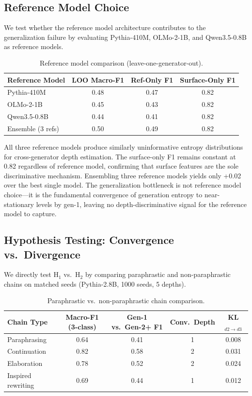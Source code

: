 \documentclass[letterpaper]{article}
\begin{document}
\subsection{Reference Model Choice}
\label{sec:refmodel}

We test whether the reference model architecture contributes to the generalization failure by evaluating Pythia-410M, OLMo-2-1B, and Qwen3.5-0.8B as reference models.

\begin{table}[h]
\centering
\caption{Reference model comparison (leave-one-generator-out).}
\label{tab:refmodel}
\begin{tabular}{lccc}
\toprule
Reference Model & LOO Macro-F1 & Ref-Only F1 & Surface-Only F1 \\
\midrule
Pythia-410M & 0.48 & 0.47 & 0.82 \\
OLMo-2-1B & 0.45 & 0.43 & 0.82 \\
Qwen3.5-0.8B & 0.44 & 0.41 & 0.82 \\
Ensemble (3 refs) & 0.50 & 0.49 & 0.82 \\
\bottomrule
\end{tabular}
\end{table}

All three reference models produce similarly uninformative entropy distributions for cross-generator depth estimation. The surface-only F1 remains constant at 0.82 regardless of reference model, confirming that surface features are the sole discriminative mechanism. Ensembling three reference models yields only +0.02 over the best single model. The generalization bottleneck is not reference model choice---it is the fundamental convergence of generation entropy to near-stationary levels by gen-1, leaving no depth-discriminative signal for the reference model to capture.

\subsection{Hypothesis Testing: Convergence vs.\ Divergence}
\label{sec:convergence}

We directly test H$_1$ vs.\ H$_2$ by comparing paraphrastic and non-paraphrastic chains on matched seeds (Pythia-2.8B, 1000 seeds, 5 depths).

\begin{table}[h]
\centering
\caption{Paraphrastic vs.\ non-paraphrastic chain comparison.}
\label{tab:convergence}
\begin{tabular}{lcccc}
\toprule
Chain Type & Macro-F1 (3-class) & Gen-1 vs.\ Gen-2+ F1 & Conv.\ Depth & KL$_{d2 \to d3}$ \\
\midrule
Paraphrasing & 0.64 & 0.41 & 1 & 0.008 \\
Continuation & 0.82 & 0.58 & 2 & 0.031 \\
Elaboration & 0.78 & 0.52 & 2 & 0.024 \\
Inspired rewriting & 0.69 & 0.44 & 1 & 0.012 \\
\bottomrule
\end{tabular}
\end{table}
\end{document}
